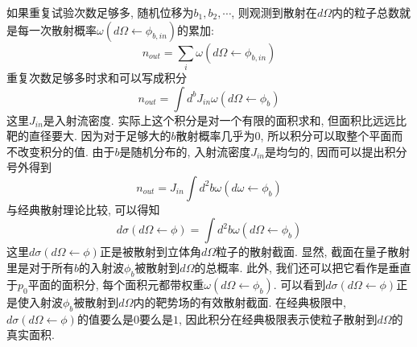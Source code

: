 \documentclass[a4paper,11pt]{book}
\begin{document}
如果重复试验次数足够多, 随机位移为$b_1,b_2,\cdots$, 则观测到散射在$d\Omega$内的粒子总数就是每一次散射概率$\omega(d\Omega\leftarrow\phi_{b,in})$的累加:
\begin{equation}
  n_{out}=\sum_{i}\omega(d\Omega\leftarrow\phi_{b,in})
\end{equation}
重复次数足够多时求和可以写成积分
\begin{equation}
  n_{out}=\int d^b J_{in}\omega(d\Omega\leftarrow \phi_b)
\end{equation}
这里$J_{in}$是入射流密度. 实际上这个积分是对一个有限的面积求和, 但面积比远远比靶的直径要大. 因为对于足够大的$b$散射概率几乎为$0$, 所以积分可以取整个平面而不改变积分的值. 由于$b$是随机分布的, 入射流密度$J_{in}$是均匀的, 因而可以提出积分号外得到
\begin{equation}
  n_{out}=J_{in}\int d^2b\omega(d\omega\leftarrow\phi_b)
\end{equation}
与经典散射理论比较, 可以得知
\begin{equation}\label{Cross-section compute}
  d\sigma(d\Omega\leftarrow\phi)=\int d^2b\omega(d\Omega\leftarrow\phi_b)
\end{equation}
这里$d\sigma(d\Omega\leftarrow\phi)$正是被散射到立体角$d\Omega$粒子的散射截面. 显然, 截面在量子散射里是对于所有$b$的入射波$\phi_b$被散射到$d\Omega$的总概率. 此外, 我们还可以把它看作是垂直于$p_0$平面的面积分, 每个面积元都带权重$\omega(d\Omega\leftarrow\phi_b)$. 可以看到$d\sigma(d\Omega\leftarrow\phi)$正是使入射波$\phi_b$被散射到$d\Omega$内的靶势场的有效散射截面. 在经典极限中, $d\sigma(d\Omega\leftarrow\phi)$的值要么是$0$要么是$1$, 因此积分在经典极限表示使粒子散射到$d\Omega$的真实面积.
\end{document}
